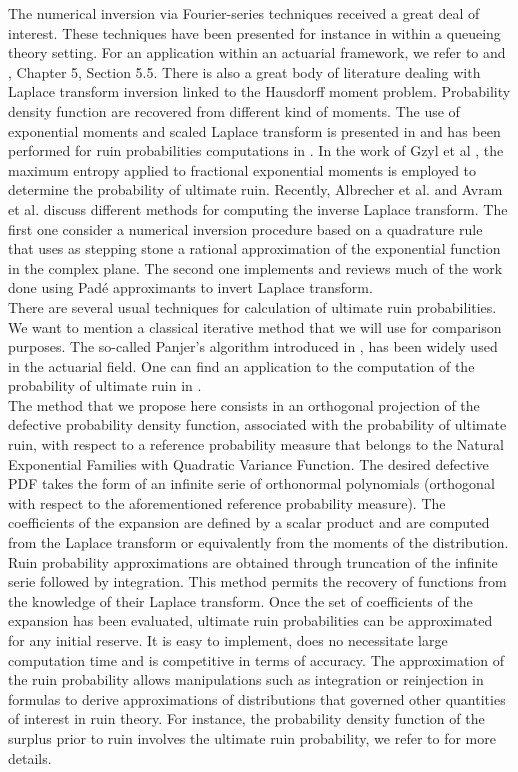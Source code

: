 The numerical inversion via Fourier-series techniques received a great deal of interest. These techniques have been presented for instance in \citet{AbWh92} within a queueing theory setting. For an application within an actuarial framework, we refer to \citet{EmGrPi93} and \citet{RoScScTe99}, Chapter 5, Section 5.5. There is also a great body of literature dealing with Laplace transform inversion linked to the Hausdorff moment problem. Probability density function are recovered from different kind of moments. The use of exponential moments and scaled Laplace transform is presented in \citet{MnSa13} and has been performed for ruin probabilities computations in \citet{MnSaHa14}. In the work of Gzyl et al \citet{GzNITa13}, the maximum entropy applied to fractional exponential moments is employed to determine the probability of ultimate ruin. Recently, Albrecher et al. \citet{AlAvKo10} and Avram et al. \citet{AvChHo11} discuss different methods for computing the inverse Laplace transform. The first one consider a numerical inversion procedure based on a quadrature rule that uses as stepping stone a rational approximation of the exponential function in the complex plane. The second one implements and reviews much of the work done using Padé approximants to invert Laplace transform. \\

There are several usual techniques for calculation of ultimate ruin probabilities. We want to mention a classical iterative method that we will use for comparison purposes. The so-called Panjer\rq{}s algorithm introduced in \citet{Pa81}, has been widely used in the actuarial field. One can find an application to the computation of the probability of ultimate ruin in \citet{Di95}.\\

The method that we propose here consists in an orthogonal projection of the defective probability density function, associated with the probability of ultimate ruin, with respect to a reference probability measure that belongs to the Natural Exponential Families with Quadratic Variance Function. The desired defective PDF takes the form of an infinite serie of orthonormal polynomials (orthogonal with respect to the aforementioned reference probability measure). The coefficients of the expansion are defined by a scalar product and are computed from the Laplace transform or equivalently from the moments of the distribution. Ruin probability approximations are obtained through truncation of the infinite serie followed by integration. This method permits the recovery of functions from the knowledge of their Laplace transform. Once the set of coefficients of the expansion has been evaluated, ultimate ruin probabilities can be approximated for any initial reserve. It is easy to implement, does no necessitate large computation time and is competitive in terms of accuracy.  The approximation of the ruin probability allows manipulations such as integration or reinjection in formulas to derive approximations of distributions that governed other quantities of interest in ruin theory. For instance, the probability density function of the surplus prior to ruin involves the ultimate ruin probability, we refer to \citet{Di92,GeSh98} for more details.\\


